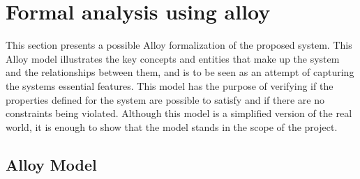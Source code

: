 \documentclass[../RASD.tex]{subfiles}
\begin{document}
    \chapter{Formal analysis using alloy }\label{ch:formal-analysis-using-alloy}
    This section presents a possible Alloy formalization of the proposed system.
    This Alloy model illustrates the key concepts and entities that make up the system and the relationships
    between them, and is to be seen as an attempt of capturing the systems essential features.
    This model has the purpose of verifying if the properties defined for the system are possible to satisfy and if there are no constraints being violated.
    Although this model is a simplified version of the real world, it is enough to show that the model stands in the scope of the project.

    \section{Alloy Model}\label{sec:alloy-model}
        \vspace{2 mm}
        
        \vspace{8 mm}
\end{document}
